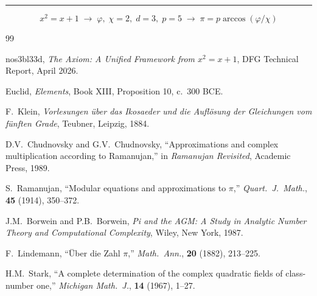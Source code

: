 \documentclass[11pt,a4paper]{article}
\theoremstyle{plain}
\theoremstyle{definition}
\begin{document}
\bigskip
\begin{center}
\rule{0.3\textwidth}{0.4pt}
\end{center}

\begin{equation*}
  x^2 = x + 1
  \;\longrightarrow\;
  \varphi,\; \chi = 2,\; d = 3,\; p = 5
  \;\longrightarrow\;
  \pi = p\arccos(\varphi/\chi)
\end{equation*}

\begin{thebibliography}{99}

  nos3bl33d,
  \emph{The Axiom: A Unified Framework from $x^2 = x + 1$},
  DFG Technical Report, April 2026.

  Euclid,
  \emph{Elements}, Book XIII, Proposition 10,
  c.\ 300 BCE.

  F.~Klein,
  \emph{Vorlesungen \"uber das Ikosaeder und die Aufl\"osung der
  Gleichungen vom f\"unften Grade},
  Teubner, Leipzig, 1884.

  D.V.~Chudnovsky and G.V.~Chudnovsky,
  ``Approximations and complex multiplication according to Ramanujan,''
  in \emph{Ramanujan Revisited}, Academic Press, 1989.

  S.~Ramanujan,
  ``Modular equations and approximations to $\pi$,''
  \emph{Quart.\ J.\ Math.}, \textbf{45} (1914), 350--372.

  J.M.~Borwein and P.B.~Borwein,
  \emph{Pi and the AGM: A Study in Analytic Number Theory and
  Computational Complexity},
  Wiley, New York, 1987.

  F.~Lindemann,
  ``\"Uber die Zahl $\pi$,''
  \emph{Math.\ Ann.}, \textbf{20} (1882), 213--225.

  H.M.~Stark,
  ``A complete determination of the complex quadratic fields of
  class-number one,''
  \emph{Michigan Math.\ J.}, \textbf{14} (1967), 1--27.

\end{thebibliography}
\end{document}
